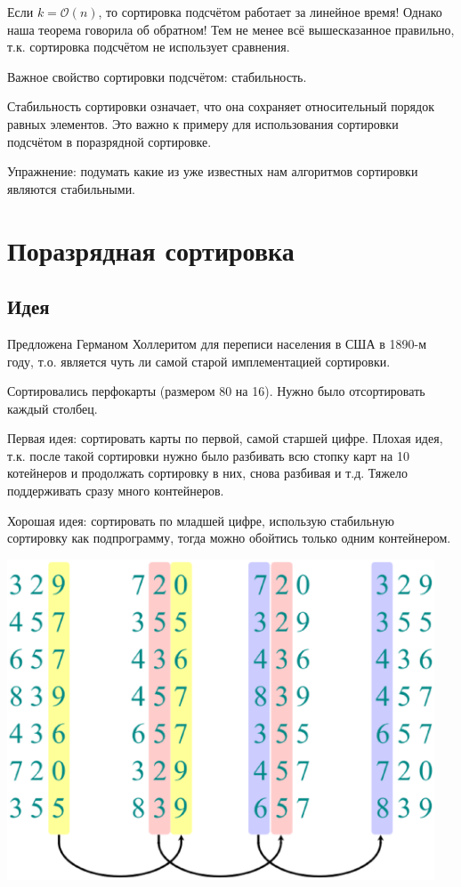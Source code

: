 \documentclass[a4paper,11pt]{article}
\begin{document}
Если $k = \mathcal{O}(n)$, то сортировка подсчётом работает за линейное время!
Однако наша теорема говорила об обратном! Тем не менее всё вышесказанное
правильно, т.к. сортировка подсчётом не использует сравнения.

Важное свойство сортировки подсчётом: стабильность.

Стабильность сортировки означает, что она сохраняет относительный порядок равных
элементов. Это важно к примеру для использования сортировки подсчётом в
поразрядной сортировке.

Упражнение: подумать какие из уже известных нам алгоритмов сортировки являются
стабильными.

\section{Поразрядная сортировка}

\subsection{Идея}
Предложена Германом Холлеритом для переписи населения в США в 1890-м году, т.о.
является чуть ли самой старой имплементацией сортировки.

Сортировались перфокарты (размером 80 на 16). Нужно было отсортировать каждый
столбец.

Первая идея: сортировать карты по первой, самой старшей цифре. Плохая идея, т.к.
после такой сортировки нужно было разбивать всю стопку карт на 10 котейнеров и
продолжать сортировку в них, снова разбивая и т.д. Тяжело поддерживать сразу
много контейнеров.

Хорошая идея: сортировать по младшей цифре, использую стабильную сортировку как
подпрограмму, тогда можно обойтись только одним контейнером.

\includegraphics[width=5in]{lecture5/radix-example.eps}
\end{document}
